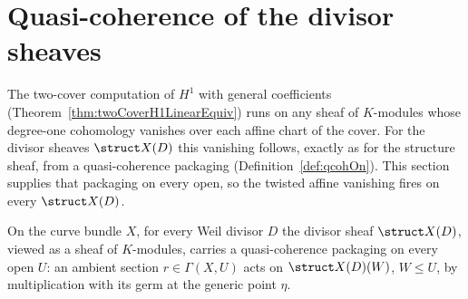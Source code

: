 \section{Quasi-coherence of the divisor sheaves}

The two-cover computation of \(H^1\) with general coefficients
(Theorem~\ref{thm:twoCoverH1LinearEquiv}) runs on any sheaf of \(K\)-modules whose degree-one
cohomology vanishes over each affine chart of the cover. For the divisor sheaves \(\struct X(D)\)
this vanishing follows, exactly as for the structure sheaf, from a quasi-coherence packaging
(Definition~\ref{def:qcohOn}). This section supplies that packaging on every open, so the twisted
affine vanishing fires on every \(\struct X(D)\).

\begin{theorem}
  \label{thm:divisorSheaf_qcohOn}
  \leanok
  On the curve bundle \(X\), for every Weil divisor \(D\) the divisor sheaf \(\struct X(D)\),
  viewed as a sheaf of \(K\)-modules, carries a quasi-coherence packaging on every open \(U\): an
  ambient section \(r \in \Gamma(X, U)\) acts on \(\struct X(D)(W)\), \(W \le U\), by multiplication
  with its germ at the generic point \(\eta\).
\end{theorem}
